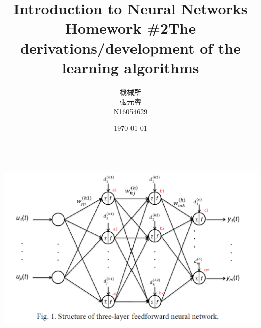 \documentclass[12pt,a4paper]{article}
\title{Introduction to Neural Networks \\ Homework \#2}
\author{機械所 \\張元睿 \\N16054629}
\date{\today}
\begin{document}
	\begin{CJK}{UTF8}{bsmi}
	\maketitle
	\newpage
	
\title{\normalsize \bf The derivations/development of the learning algorithms}
\\[0.5cm]
\includegraphics[scale=0.5]{hw2}


\end{CJK}
\end{document}

